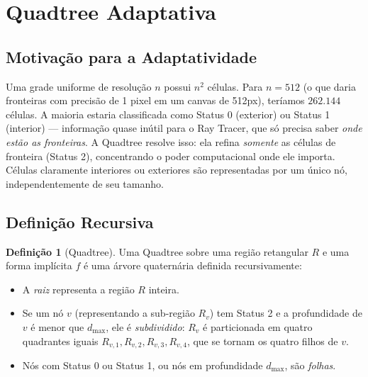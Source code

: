 \documentclass[11pt,a4paper]{article}
\theoremstyle{plain}
\theoremstyle{definition}
\newtheorem{definition}[theorem]{Definição}
\begin{document}
\section{Quadtree Adaptativa}
\label{sec:quadtree}

\subsection{Motivação para a Adaptatividade}

\begin{tcolorbox}[motivacao]
Uma grade uniforme de resolução $n$ possui $n^2$ células. Para $n = 512$ (o que
daria fronteiras com precisão de 1 pixel em um canvas de 512px), teríamos
$262.144$ células. A maioria estaria classificada como Status 0 (exterior) ou
Status 1 (interior) --- informação quase inútil para o Ray Tracer, que só
precisa saber \emph{onde estão as fronteiras}. A Quadtree resolve isso: ela
refina \emph{somente} as células de fronteira (Status 2), concentrando o poder
computacional onde ele importa. Células claramente interiores ou exteriores são
representadas por um único nó, independentemente de seu tamanho.
\end{tcolorbox}

\subsection{Definição Recursiva}

\begin{definition}[Quadtree]
Uma Quadtree sobre uma região retangular $R$ e uma forma implícita $f$ é uma
árvore quaternária definida recursivamente:
\begin{itemize}
    \item A \emph{raiz} representa a região $R$ inteira.
    \item Se um nó $v$ (representando a sub-região $R_v$) tem Status 2 e a
    profundidade de $v$ é menor que $d_{\max}$, ele é \emph{subdividido}: $R_v$
    é particionada em quatro quadrantes iguais $R_{v,1}, R_{v,2}, R_{v,3}, R_{v,4}$,
    que se tornam os quatro filhos de $v$.
    \item Nós com Status 0 ou Status 1, ou nós em profundidade $d_{\max}$, são
    \emph{folhas}.
\end{itemize}
\end{definition}
\end{document}
